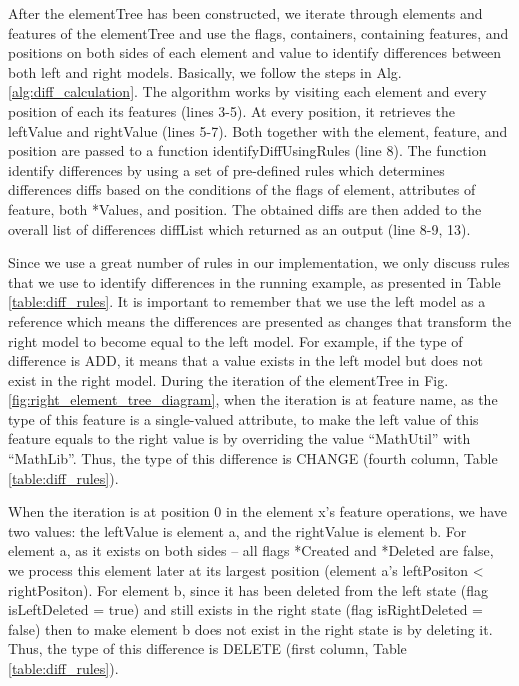 \documentclass{llncs}
\begin{document}
After the \textsf{elementTree} has been constructed, we iterate through elements and features of the \textsf{elementTree} and use the flags, containers, containing features, and positions on both sides of each element and value to identify differences between both left and right models. Basically, we follow the steps in Alg. \ref{alg:diff_calculation}. The algorithm works by visiting each element and every position of each its features (lines 3-5). At every position, it retrieves the \textsf{leftValue} and \textsf{rightValue} (lines 5-7).  Both together with the \textsf{element}, \textsf{feature}, and \textsf{position} are passed to a function \textsf{identifyDiffUsingRules} (line 8). The function identify differences by using a set of pre-defined rules which determines differences \textsf{diffs} based on the conditions of the flags of \textsf{element}, attributes of \textsf{feature}, both \textsf{*Values}, and \textsf{position}. The obtained \textsf{diffs} are then added to the overall list of differences \textsf{diffList} which returned as an output (line 8-9, 13). 

Since we use a great number of rules in our implementation, we only discuss rules that we use to identify differences in the running example, as presented in Table \ref{table:diff_rules}. It is important to remember that we use the left model as a reference which means the differences are presented as changes that transform the right model to become equal to the left model. For example, if the type of difference is \textsf{ADD}, it means that a value exists in the left model but does not exist in the right model. During the iteration of the \textsf{elementTree} in Fig. \ref{fig:right_element_tree_diagram}, when the iteration is at feature \textsf{name}, as the type of this feature is a single-valued attribute, to make the left value of this feature equals to the right value is by overriding the value ``MathUtil'' with ``MathLib''. Thus, the type of this difference is \textsf{CHANGE} (fourth column, Table \ref{table:diff_rules}).

When the iteration is at position 0 in the element \textsf{x}'s feature \textsf{operations}, we have two values: the \textsf{leftValue} is element \textsf{a}, and the \textsf{rightValue} is element \textsf{b}. For element \textsf{a}, as it exists on both sides -- all flags \textsf{*Created} and \textsf{*Deleted} are false, we process this element later at its largest position (element \textsf{a}'s \textsf{leftPositon} < \textsf{rightPositon}). For element \textsf{b}, since it has been deleted from the left state (flag \textsf{isLeftDeleted} = true) and still exists in the right state (flag \textsf{isRightDeleted} = false) then to make element \textsf{b} does not exist in the right state is by deleting it. Thus, the type of this difference is \textsf{DELETE} (first column, Table \ref{table:diff_rules}).
\end{document}

